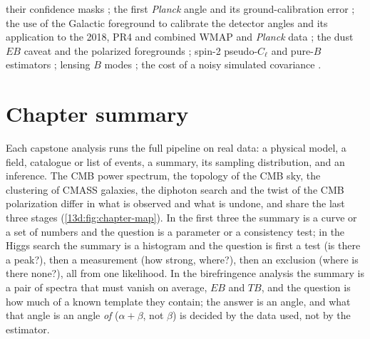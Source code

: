 \begin{itemize}[itemsep=2pt,leftmargin=1.2em]
        their confidence masks \cite{Planck2018IV}; the first \textit{Planck} angle and its
        ground-calibration error \cite{PlanckIntXLIX2016}; the use of the Galactic foreground
        to calibrate the detector angles \cite{Minami2019} and its application to the 2018,
        PR4 and combined WMAP and \textit{Planck} data
        \cite{MinamiKomatsu2020,DiegoPalazuelos2022,EskiltKomatsu2022}; the dust $EB$
        caveat \cite{Clark2021} and the polarized foregrounds \cite{Planck2018XI}; spin-2
        pseudo-$C_\ell$ \cite{Alonso2019} and pure-$B$ estimators \cite{SmithPureB2006};
        lensing $B$ modes \cite{ZaldarriagaSeljak1998,LewisChallinor2006}; the cost of a
        noisy simulated covariance \cite{DodelsonSchneider2013}.
\end{itemize}

\section*{Chapter summary}
\label{13d:sec:chapter-summary}

Each capstone analysis runs the full pipeline on real data: a physical model, a field,
catalogue or list of events, a summary, its sampling distribution, and an inference. The
CMB power spectrum, the topology of the CMB sky, the clustering of CMASS galaxies, the
diphoton search and the twist of the CMB polarization differ in what is observed and what
is undone, and share the last three stages (\cref{13d:fig:chapter-map}). In the first three
the summary is a curve or a set of numbers and the question is a parameter or a consistency
test; in the Higgs search the summary is a histogram and the question is first a test (is
there a peak?), then a measurement (how strong, where?), then an exclusion (where is there
none?), all from one likelihood. In the birefringence analysis the summary is a pair of
spectra that must vanish on average, $EB$ and $TB$, and the question is how much of a known
template they contain; the answer is an angle, and what that angle is an angle \emph{of}
($\alpha+\beta$, not $\beta$) is decided by the data used, not by the estimator.

